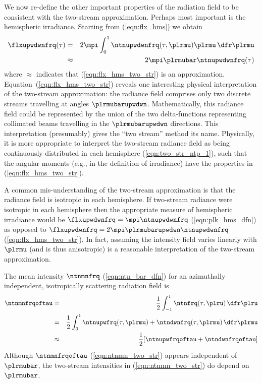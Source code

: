 \documentclass[12pt]{article}
\begin{document}
We now re-define the other important properties of the radiation field
to be consistent with the two-stream approximation.
Perhaps most important is the hemispheric irradiance.
Starting from (\ref{eqn:flx_hms}) we obtain
\begin{eqnarray}
\flxupwdwnfrq(\tau) & = & 
2 \mpi \int_{0}^{1} \ntnupwdwnfrq (\tau,\plrmu) \plrmu \,\dfr\plrmu 
\nonumber \\
& \approx & 2 \mpi \plrmubar \ntnupwdwnfrq (\tau)
\label{eqn:flx_hms_two_str}
\end{eqnarray}
where $\approx$ indicates that (\ref{eqn:flx_hms_two_str}) is an
approximation. 
Equation~(\ref{eqn:flx_hms_two_str}) reveals one interesting
physical interpretation of the two-stream approximation:
the radiance field comprises only two discrete streams
travelling at angles $\plrmubarupwdwn$. 
Mathematically, this radiance field could be represented by the
union of the two delta-functions representing collimated beams
travelling in the $\plrmubarupwdwn$ directions.
This interpretation (presumably) gives the ``two stream'' method its
name. 
Physically, it is more appropriate to interpret the two-stream
radiance field as being continuously distributed in each hemisphere
(\ref{eqn:two_str_ntp_1}), such that the angular moments (e.g., in the
definition of irradiance) have the properties in
(\ref{eqn:flx_hms_two_str}).

A common mis-understanding of the two-stream approximation is that
the radiance field is isotropic in each hemisphere.
If two-stream radiance were isotropic in each hemisphere then the
appropriate measure of hemispheric irradiance would be
$\flxupwdwnfrq = \mpi \ntnupwdwnfrq$ (\ref{eqn:plk_hms_dfn}) as opposed to 
$\flxupwdwnfrq = 2 \mpi \plrmubarupwdwn \ntnupwdwnfrq$
(\ref{eqn:flx_hms_two_str}). 
In fact, assuming the intensity field varies linearly with $\plrmu$ 
(and is thus anisotropic) is a reasonable interpretation of the
two-stream approximation.

The mean intensity $\ntnmnfrq$ (\ref{eqn:ntn_bar_dfn}) for an
azimuthally independent, isotropically scattering radiation field is 
\begin{eqnarray}
\ntnmnfrqoftau
& = & \frac{1}{2} \int_{-1}^{1} \ntnfrq(\tau,\plru) \,\dfr\plru
\nonumber \\
& = & \frac{1}{2} \int_{0}^{1} \ntnupwfrq(\tau,\plrmu) +
\ntndwnfrq(\tau,\plrmu) \,\dfr\plrmu \nonumber \\
& \approx & \frac{1}{2} [\ntnupwfrqoftau + \ntndwnfrqoftau] 
\label{eqn:ntnmn_two_str}
\end{eqnarray}
Although $\ntnmnfrqoftau$ (\ref{eqn:ntnmn_two_str}) appears
independent of $\plrmubar$, the two-stream intensities in
(\ref{eqn:ntnmn_two_str}) do depend on $\plrmubar$.
\end{document}

